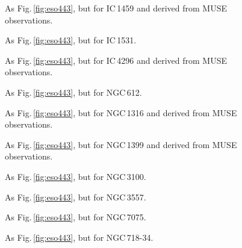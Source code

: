\documentclass[a4paper,fleqn,usenatbib]{mnras}
\begin{document}
\begin{figure}
  \centering
  \caption{As Fig.\,\ref{fig:eso443}, but for IC\,1459 and derived
    from MUSE observations.}
  \label{fig:ic1459}
\end{figure}

\begin{figure}
  \centering
  \caption{As Fig.\,\ref{fig:eso443}, but for IC\,1531.}
  \label{fig:ic1531}
\end{figure}

\begin{figure}
  \centering
  \caption{As Fig.\,\ref{fig:eso443}, but for IC\,4296 and derived
    from MUSE observations.}
  \label{fig:ic4296}
\end{figure}

\begin{figure}
  \centering
  \caption{As Fig.\,\ref{fig:eso443}, but for NGC\,612.}
  \label{fig:ngc612}
\end{figure}

\begin{figure}
  \centering
  \caption{As Fig.\,\ref{fig:eso443}, but for NGC\,1316 and derived
    from MUSE observations.}
  \label{fig:ngc1316}
\end{figure}

\begin{figure}
  \centering
  \caption{As Fig.\,\ref{fig:eso443}, but for NGC\,1399 and derived
    from MUSE observations.}
  \label{fig:ngc1399}
\end{figure}

\begin{figure}
  \centering
  \caption{As Fig.\,\ref{fig:eso443}, but for NGC\,3100.}
  \label{fig:ngc3100}
\end{figure}

\begin{figure}
  \centering
  \caption{As Fig.\,\ref{fig:eso443}, but for NGC\,3557.}
  \label{fig:ngc3557}
\end{figure}

\begin{figure}
  \centering
  \caption{As Fig.\,\ref{fig:eso443}, but for NGC\,7075.}
  \label{fig:ngc7075}
\end{figure}

\begin{figure}
  \centering
  \caption{As Fig.\,\ref{fig:eso443}, but for NGC\,718-34.}
  \label{fig:pks718}
\end{figure}



\bsp	%
\label{lastpage}
\end{document}
